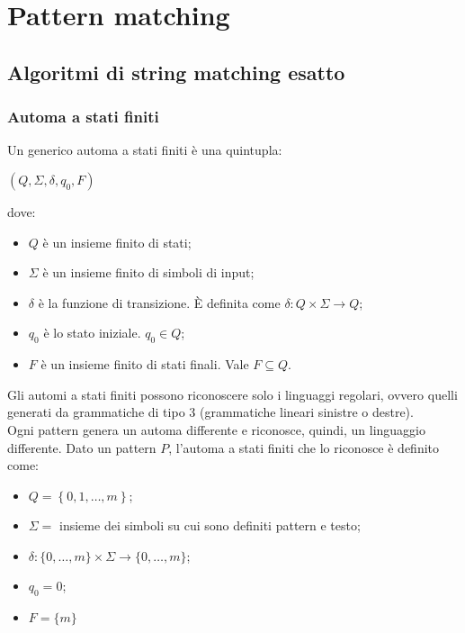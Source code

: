 \chapter{Pattern matching}
\section{Algoritmi di string matching esatto}

\subsection{Automa a stati finiti}
Un generico automa a stati finiti è una quintupla:
\begin{center}
    $(Q, \Sigma, \delta, q_0, F)$
\end{center}
dove:
\begin{itemize}
    \item $Q$ è un insieme finito di stati;
    \item $\Sigma$ è un insieme finito di simboli di input;
    \item $\delta$ è la funzione di transizione. È definita come $\delta: Q \times \Sigma \rightarrow Q$;
    \item $q_0$ è lo stato iniziale. $q_0 \in Q$;
    \item $F$ è un insieme finito di stati finali. Vale $F \subseteq Q$.
\end{itemize}
Gli automi a stati finiti possono riconoscere solo i linguaggi regolari, ovvero quelli generati da grammatiche di tipo 3 (grammatiche lineari sinistre o destre).\\
Ogni pattern genera un automa differente e riconosce, quindi, un linguaggio differente.
Dato un pattern $P$, l'automa a stati finiti che lo riconosce è definito come:
\begin{itemize}
    \item $Q = \left\{ 0, 1, \ldots, m \right\}$;
    \item $\Sigma = $ insieme dei simboli su cui sono definiti pattern e testo;
    \item $\delta : \{ 0, \ldots, m \} \times \Sigma \rightarrow \{ 0, \ldots, m \}$;
    \item $q_0 = 0$;
    \item $F = \{ m \}$
\end{itemize}


